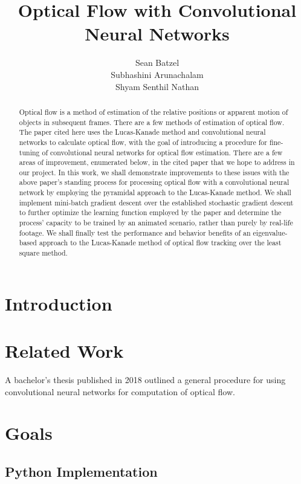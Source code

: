 \documentclass[]{article}
\title{Optical Flow with Convolutional Neural Networks}
\author{Sean Batzel\\Subhashini Arunachalam\\Shyam Senthil Nathan}
\begin{document}
\maketitle
\nocite{*}

\pagebreak
\begin{abstract}
    Optical flow is a method of estimation of the relative positions or apparent motion of objects in subsequent frames.
    There are a few methods of estimation of optical flow.
    The paper cited here uses the Lucas-Kanade method and convolutional neural networks to calculate optical flow, with the goal of introducing a procedure for fine-tuning of convolutional neural networks for optical flow estimation.
    There are a few areas of improvement, enumerated below, in the cited paper that we hope to address in our project.
    In this work, we shall demonstrate improvements to these issues with the above paper’s standing process for processing optical flow with a convolutional neural network by employing the pyramidal approach to the Lucas-Kanade method.
    We shall implement mini-batch gradient descent over the established stochastic gradient descent to further optimize the learning function employed by the paper and determine the process’ capacity to be trained by an animated scenario, rather than purely by real-life footage.
    We shall finally test the performance and behavior benefits of an eigenvalue-based approach to the Lucas-Kanade method of optical flow tracking over the least square method.
\end{abstract}

\section{Introduction}\label{sec:introduction}

\section{Related Work}\label{sec:related-work}
A bachelor's thesis published in 2018 outlined a general procedure for using convolutional neural networks for computation of optical flow.\cite{flett}

\section{Goals}\label{sec:goals}
\subsection{Python Implementation}\label{subsec:python-implementation}
\end{document}

